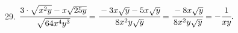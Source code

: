 29. $\cfrac{3\cdot\sqrt{x^2y}-x\sqrt{25y}}{\sqrt{64x^4y^3}}=\cfrac{-3x\sqrt{y}-5x\sqrt{y}}{8x^2y\sqrt{y}}=\cfrac{-8x\sqrt{y}}{8x^2y\sqrt{y}}=-\cfrac{1}{xy}.$\\
